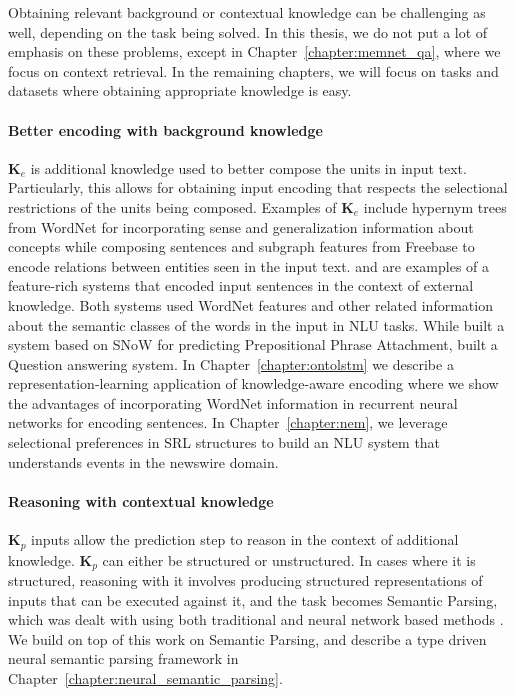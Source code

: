 Obtaining relevant background or contextual
knowledge can be challenging as well, depending on the task being solved. In this thesis, we do not put a lot of emphasis on these
problems, except in Chapter~\ref{chapter:memnet_qa}, where we focus on context retrieval. In the remaining chapters, we will focus on tasks
and datasets where obtaining appropriate knowledge is easy.

\paragraph{Better encoding with background knowledge}
$\mathbf{K}_e$ is additional knowledge used to better compose the units in input text. Particularly, this allows for
obtaining input encoding that respects the selectional restrictions of the units being composed.
Examples of $\mathbf{K}_e$ include hypernym trees from WordNet for
incorporating sense and generalization information about concepts while composing sentences and subgraph features from Freebase to encode relations
between entities seen in the input text. \cite{moldovan2001logic} and \cite{krymolowski1998incorporating} are examples of a feature-rich systems that encoded input sentences in the 
context of external knowledge. Both systems used WordNet features and other related information about the semantic classes of the words in the input in NLU tasks. While \cite{krymolowski1998incorporating} 
built a system based on SNoW \cite{CCRR99} for predicting Prepositional Phrase Attachment, \cite{moldovan2001logic} built a Question answering system. In Chapter~\ref{chapter:ontolstm} we describe
a representation-learning application of knowledge-aware encoding where we show the advantages of incorporating WordNet information in recurrent neural networks for encoding sentences. In Chapter~\ref{chapter:nem},
we leverage selectional preferences in SRL structures to build an NLU system that understands events in the newswire domain.

\paragraph{Reasoning with contextual knowledge}
$\textbf{K}_p$ inputs allow the prediction step to reason in the context of additional knowledge. $\textbf{K}_p$ can either be structured or unstructured. In cases where it is structured,
reasoning with it involves producing structured representations of inputs that can be executed against it, and the task becomes Semantic Parsing, which was dealt with using
both traditional \cite[among others]{Zelle1996LearningTP,Zettlemoyer2005LearningTM,zettlemoyer2007online} and neural network based methods
\cite{Dong2016LanguageTL,Andreas2016LearningTC,Liang2016NeuralSM,Neelakantan2016LearningAN}. We build on top of this work on Semantic Parsing, and describe a type driven neural semantic 
parsing framework in Chapter~\ref{chapter:neural_semantic_parsing}.


